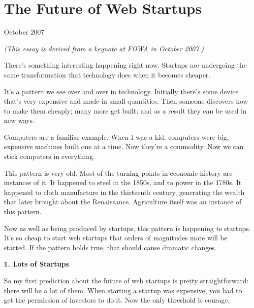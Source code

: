 \chapter{The Future of Web Startups}


            
              
                


                  
                    October 2007

\emph{(This essay is derived from a keynote at FOWA in October
                      2007.)}

There's something interesting happening right
                    now. Startups are undergoing the same transformation that
                    technology does when it becomes cheaper.

It's a
                    pattern we see over and over in technology. Initially
                    there's some device that's very expensive and made in small
                    quantities. Then someone discovers how to make them cheaply;
                    many more get built; and as a result they can be used in new
                    ways.

Computers are a familiar example. When I
                    was a kid, computers were big, expensive machines built one
                    at a time. Now they're a commodity. Now we can stick
                    computers in everything.

This pattern is very
                    old. Most of the turning points in economic history are
                    instances of it. It happened to steel in the 1850s, and to
                    power in the 1780s. It happened to cloth manufacture in the
                    thirteenth century, generating the wealth that later brought
                    about the Renaissance. Agriculture itself was an instance of
                    this pattern.

Now as well as being produced by
                    startups, this pattern is happening \emph{to} startups. It's
                    so cheap to start web startups that orders of magnitudes
                    more will be started. If the pattern holds true, that should
                    cause dramatic changes.

\textbf{1. Lots of Startups}

So my first prediction about the future of web
                    startups is pretty straightforward: there will be a lot of
                    them. When starting a startup was expensive, you had to get
                    the permission of investors to do it. Now the only threshold
                    is courage.


